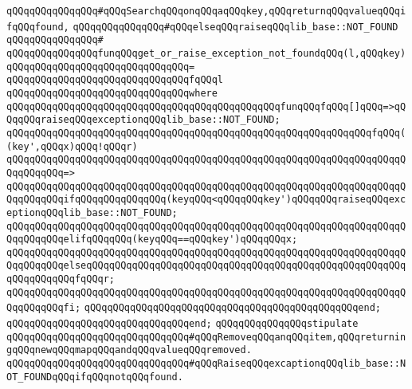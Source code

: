 \newline
\verb|qQQqqQQqqQQqqQQq#qQQqSearchqQQqonqQQqaqQQqkey,qQQqreturnqQQqvalueqQQqifqQQqfound,|\newline
\verb|qQQqqQQqqQQqqQQq#qQQqelseqQQqraiseqQQqlib_base::NOT_FOUND|\newline
\verb|qQQqqQQqqQQqqQQq#|\newline
\verb|qQQqqQQqqQQqqQQqfunqQQqget_or_raise_exception_not_foundqQQq(l,qQQqkey)|\newline
\verb|qQQqqQQqqQQqqQQqqQQqqQQqqQQqqQQq=|\newline
\verb|qQQqqQQqqQQqqQQqqQQqqQQqqQQqqQQqfqQQql|\newline
\verb|qQQqqQQqqQQqqQQqqQQqqQQqqQQqqQQqwhere|\newline
\verb|qQQqqQQqqQQqqQQqqQQqqQQqqQQqqQQqqQQqqQQqqQQqqQQqfunqQQqfqQQq[]qQQq=>qQQqqQQqraiseqQQqexceptionqQQqlib_base::NOT_FOUND;|\newline
\newline
\verb|qQQqqQQqqQQqqQQqqQQqqQQqqQQqqQQqqQQqqQQqqQQqqQQqqQQqqQQqqQQqqQQqfqQQq((key',qQQqx)qQQq!qQQqr)|\newline
\verb|qQQqqQQqqQQqqQQqqQQqqQQqqQQqqQQqqQQqqQQqqQQqqQQqqQQqqQQqqQQqqQQqqQQqqQQqqQQqqQQq=>|\newline
\verb|qQQqqQQqqQQqqQQqqQQqqQQqqQQqqQQqqQQqqQQqqQQqqQQqqQQqqQQqqQQqqQQqqQQqqQQqqQQqqQQqifqQQqqQQqqQQqqQQq(keyqQQq<qQQqqQQqkey')qQQqqQQqraiseqQQqexceptionqQQqlib_base::NOT_FOUND;|\newline
\verb|qQQqqQQqqQQqqQQqqQQqqQQqqQQqqQQqqQQqqQQqqQQqqQQqqQQqqQQqqQQqqQQqqQQqqQQqqQQqqQQqelifqQQqqQQq(keyqQQq==qQQqkey')qQQqqQQqx;|\newline
\verb|qQQqqQQqqQQqqQQqqQQqqQQqqQQqqQQqqQQqqQQqqQQqqQQqqQQqqQQqqQQqqQQqqQQqqQQqqQQqqQQqelseqQQqqQQqqQQqqQQqqQQqqQQqqQQqqQQqqQQqqQQqqQQqqQQqqQQqqQQqqQQqqQQqqQQqfqQQqr;|\newline
\verb|qQQqqQQqqQQqqQQqqQQqqQQqqQQqqQQqqQQqqQQqqQQqqQQqqQQqqQQqqQQqqQQqqQQqqQQqqQQqqQQqfi;|\newline
\verb|qQQqqQQqqQQqqQQqqQQqqQQqqQQqqQQqqQQqqQQqqQQqqQQqend;|\newline
\verb|qQQqqQQqqQQqqQQqqQQqqQQqqQQqqQQqend;|\newline
\newline
\verb|qQQqqQQqqQQqqQQqstipulate|\newline
\verb|qQQqqQQqqQQqqQQqqQQqqQQqqQQqqQQq#qQQqRemoveqQQqanqQQqitem,qQQqreturningqQQqnewqQQqmapqQQqandqQQqvalueqQQqremoved.|\newline
\verb|qQQqqQQqqQQqqQQqqQQqqQQqqQQqqQQq#qQQqRaiseqQQqexcaptionqQQqlib_base::NOT_FOUNDqQQqifqQQqnotqQQqfound.|\newline
